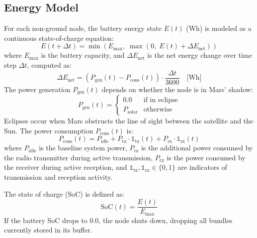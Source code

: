 \documentclass[a4paper,fleqn]{cas-dc}
\begin{document}
\subsection{Energy Model}
For each non-ground node, the battery energy state $E(t)$ (Wh) is modeled as a continuous state-of-charge equation:
\begin{equation}
    E(t + \Delta t) = \min\left(E_{\max},\; \max\left(0,\; E(t) + \Delta E_{\text{net}}\right)\right)
\end{equation}
where $E_{\max}$ is the battery capacity, and $\Delta E_{\text{net}}$ is the net energy change over time step $\Delta t$, computed as:
\begin{equation}
    \Delta E_{\text{net}} = \left(P_{\text{gen}}(t) - P_{\text{cons}}(t)\right) \cdot \frac{\Delta t}{3600} \quad \text{[Wh]}
\end{equation}
The power generation $P_{\text{gen}}(t)$ depends on whether the node is in Mars' shadow:
\begin{equation}
    P_{\text{gen}}(t) = \begin{cases}
        0.0 & \text{if in eclipse} \\
        P_{\text{solar}} & \text{otherwise}
    \end{cases}
\end{equation}
Eclipses occur when Mars obstructs the line of sight between the satellite and the Sun. The power consumption $P_{\text{cons}}(t)$ is:
\begin{equation}
    P_{\text{cons}}(t) = P_{\text{idle}} + P_{\text{tx}} \cdot \mathbb{1}_{\text{tx}}(t) + P_{\text{rx}} \cdot \mathbb{1}_{\text{rx}}(t)
\end{equation}
where $P_{\text{idle}} $ is the baseline system power, $P_{\text{tx}} $ is the additional power consumed by the radio transmitter during active transmission, $P_{\text{rx}} $ is the power consumed by the receiver during active reception, and $\mathbb{1}_{\text{tx}}, \mathbb{1}_{\text{rx}} \in \{0, 1\}$ are indicators of transmission and reception activity.

The state of charge (SoC) is defined as:
\begin{equation}
    \text{SoC}(t) = \frac{E(t)}{E_{\max}}
\end{equation}
If the battery SoC drops to $0.0$, the node shuts down, dropping all bundles currently stored in its buffer.
\end{document}
